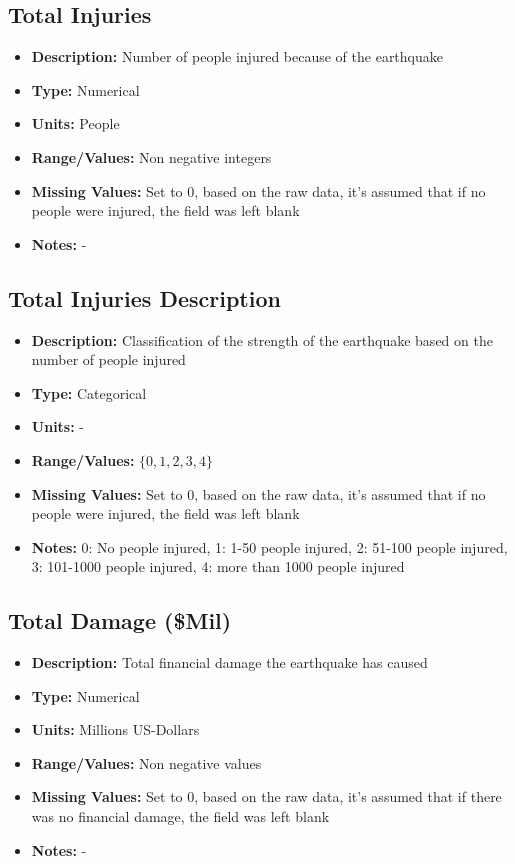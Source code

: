 \documentclass[a4paper]{article}
\begin{document}
\subsection{Total Injuries}
\begin{itemize}
    \item \textbf{Description:} Number of people injured because of the earthquake
    \item \textbf{Type:} Numerical
    \item \textbf{Units:} People
    \item \textbf{Range/Values:} Non negative integers
    \item \textbf{Missing Values:} Set to 0, based on the raw data, it's assumed that if no people were injured, the field was left blank
    \item \textbf{Notes:} -
\end{itemize}

\subsection{Total Injuries Description}
\begin{itemize}
    \item \textbf{Description:} Classification of the strength of the earthquake based on the number of people injured
    \item \textbf{Type:} Categorical
    \item \textbf{Units:} -
    \item \textbf{Range/Values:} $\{0,1,2,3,4 \}$
    \item \textbf{Missing Values:} Set to 0, based on the raw data, it's assumed that if no people were injured, the field was left blank
    \item \textbf{Notes:} 0: No people injured, 1: 1-50 people injured, 2: 51-100 people injured, 3: 101-1000 people injured, 4: more than 1000 people injured
\end{itemize}

\subsection{Total Damage (\$Mil)}
\begin{itemize}
    \item \textbf{Description:} Total financial damage the earthquake has caused
    \item \textbf{Type:} Numerical
    \item \textbf{Units:} Millions US-Dollars
    \item \textbf{Range/Values:} Non negative values 
    \item \textbf{Missing Values:} Set to 0, based on the raw data, it's assumed that if there was no financial damage, the field was left blank
    \item \textbf{Notes:} -
\end{itemize}
\end{document}
